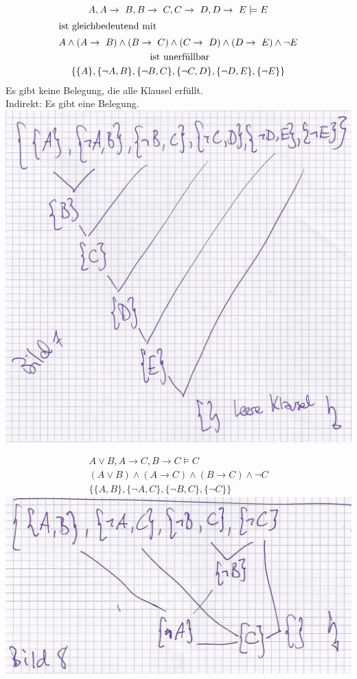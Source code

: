 \begin{bsp*}
	\begin{gather*}
		A , A \rightarrow B , B \rightarrow C , C \rightarrow D , D \rightarrow E \models E \\
		\intertext{ist gleichbedeutend mit}
		A \wedge ( A \rightarrow B ) \wedge ( B \rightarrow C ) \wedge ( C \rightarrow D ) \wedge ( D \rightarrow E ) \wedge \neg E \\
		\text{ ist unerfüllbar} \\
		\{ \{ A \} , \{ \neg A , B \} , \{ \neg B , C \} , \{ \neg C , D \} , \{ \neg D , E \} , \{ \neg E \} \}
	\end{gather*}
	Es gibt keine Belegung, die alle Klausel erfüllt. \\
	Indirekt: Es gibt eine Belegung. \\
	\includegraphics[width=\textwidth]{Bild9}
\end{bsp*}
\begin{bsp*}
	\begin{gather*}
		A \vee B , A \rightarrow C , B \rightarrow C \models C \\
		( A \vee B ) \wedge ( A \rightarrow C ) \wedge ( B \rightarrow C ) \wedge \neg  C \\
		\{ \{ A , B \} , \{ ¬ A , C \} , \{ ¬ B , C \} , \{ ¬ C \} \}
	\end{gather*}
	\includegraphics[width=\textwidth]{Bild10}
\end{bsp*}
